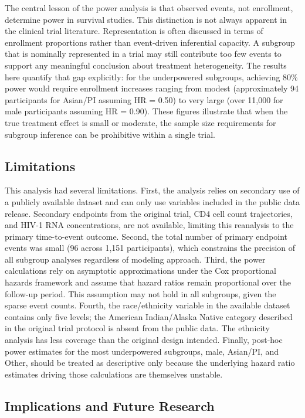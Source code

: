 \documentclass[
  letterpaper,
  DIV=11,
  numbers=noendperiod]{scrartcl}
\begin{document}
The central lesson of the power analysis is that observed events, not
enrollment, determine power in survival studies. This distinction is not
always apparent in the clinical trial literature. Representation is
often discussed in terms of enrollment proportions rather than
event-driven inferential capacity. A subgroup that is nominally
represented in a trial may still contribute too few events to support
any meaningful conclusion about treatment heterogeneity. The results
here quantify that gap explicitly: for the underpowered subgroups,
achieving 80\% power would require enrollment increases ranging from
modest (approximately 94 participants for Asian/PI assuming HR = 0.50)
to very large (over 11,000 for male participants assuming HR = 0.90).
These figures illustrate that when the true treatment effect is small or
moderate, the sample size requirements for subgroup inference can be
prohibitive within a single trial.

\subsection{Limitations}\label{limitations}

This analysis had several limitations. First, the analysis relies on
secondary use of a publicly available dataset and can only use variables
included in the public data release. Secondary endpoints from the
original trial, CD4 cell count trajectories, and HIV-1 RNA
concentrations, are not available, limiting this reanalysis to the
primary time-to-event outcome. Second, the total number of primary
endpoint events was small (96 across 1,151 participants), which
constrains the precision of all subgroup analyses regardless of modeling
approach. Third, the power calculations rely on asymptotic
approximations under the Cox proportional hazards framework and assume
that hazard ratios remain proportional over the follow-up period. This
assumption may not hold in all subgroups, given the sparse event counts.
Fourth, the race/ethnicity variable in the available dataset contains
only five levels; the American Indian/Alaska Native category described
in the original trial protocol is absent from the public data. The
ethnicity analysis has less coverage than the original design intended.
Finally, post-hoc power estimates for the most underpowered subgroups,
male, Asian/PI, and Other, should be treated as descriptive only because
the underlying hazard ratio estimates driving those calculations are
themselves unstable.

\subsection{Implications and Future
Research}\label{implications-and-future-research}
\end{document}
